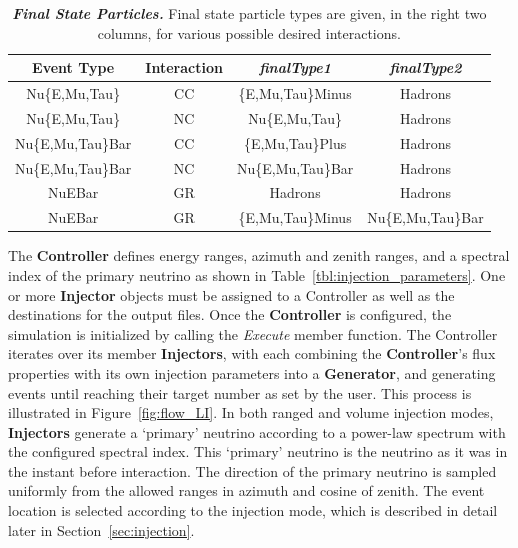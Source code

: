 \documentclass[main.tex]{subfiles}
\begin{document}
\begin{table}[h]
\centering
    \begin{tabular}{c c c c}
	\toprule
	Event Type & Interaction & \textit{finalType1} & \textit{finalType2} \\
	\midrule
	Nu\{E,Mu,Tau\} & CC & \{E,Mu,Tau\}Minus & Hadrons \\
	Nu\{E,Mu,Tau\} & NC & Nu\{E,Mu,Tau\} & Hadrons \\
	Nu\{E,Mu,Tau\}Bar & CC & \{E,Mu,Tau\}Plus & Hadrons \\
	Nu\{E,Mu,Tau\}Bar & NC & Nu\{E,Mu,Tau\}Bar & Hadrons \\
	NuEBar & GR & Hadrons & Hadrons \\
	NuEBar & GR & \{E,Mu,Tau\}Minus & Nu\{E,Mu,Tau\}Bar \\
	\bottomrule
	\end{tabular}
    \caption{\textbf{\textit{Final State Particles.}}
    Final state particle types are given, in the right two columns, for various possible desired interactions.
    }
    \label{tbl:final_types}
\end{table}

The \textbf{Controller} defines energy ranges, azimuth and zenith ranges, and a spectral index of the primary neutrino as shown in Table~\ref{tbl:injection_parameters}. 
One or more \textbf{Injector} objects must be assigned to a Controller as well as the destinations for the output files. 
Once the \textbf{Controller} is configured, the simulation is initialized by calling the \textit{Execute} member function.
The Controller iterates over its member \textbf{Injectors}, with each combining the \textbf{Controller}'s flux properties with its own injection parameters into a \textbf{Generator}, and generating events until reaching their target number as set by the user. 
This process is illustrated in Figure~\ref{fig:flow_LI}.
In both ranged and volume injection modes, \textbf{Injectors} generate a `primary' neutrino according to a power-law spectrum with the configured spectral index. 
This `primary' neutrino is the neutrino as it was in the instant before interaction.
The direction of the primary neutrino is sampled uniformly from the allowed ranges in azimuth and cosine of zenith.
The event location is selected according to the injection mode, which is described in detail later in Section~\ref{sec:injection}.
\end{document}
